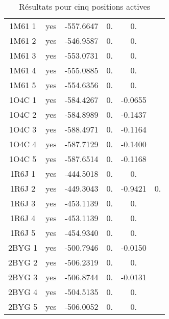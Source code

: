 \begin{table}[h]
{\begin{tabular}{cccccc}
        1M61 1 & yes &  -557.6647 & 0. & 0. &  \\
        1M61 2 & yes &  -546.9587 & 0. & 0. &  \\
        1M61 3 & yes &  -553.0731 & 0. & 0. &  \\
        1M61 4 & yes &  -555.0885 & 0. & 0. &  \\
        1M61 5 & yes &  -554.6356 & 0. & 0. &  \\
        1O4C 1 & yes &  -584.4267 & 0. & -0.0655 &  \\
        1O4C 2 & yes &  -584.8989 & 0. & -0.1437 &  \\
        1O4C 3 & yes &  -588.4971 & 0. & -0.1164 &  \\
        1O4C 4 & yes &  -587.7129 & 0. & -0.1400 &  \\
        1O4C 5 & yes &  -587.6514 & 0. & -0.1168 &  \\
        1R6J 1 & yes &  -444.5018 & 0. & 0. &  \\
        1R6J 2 & yes &  -449.3043 & 0. & -0.9421 & 0. \\
        1R6J 3 & yes &  -453.1139 & 0. & 0. &  \\
        1R6J 4 & yes &  -453.1139 & 0. & 0. &  \\
        1R6J 5 & yes &  -454.9340 & 0. & 0. &  \\
        2BYG 1 & yes &  -500.7946 & 0. & -0.0150 &  \\
        2BYG 2 & yes &  -506.2319 & 0. & 0. &  \\
        2BYG 3 & yes &  -506.8744 & 0. & -0.0131 &  \\
        2BYG 4 & yes &  -504.5135 & 0. & 0. &  \\
        2BYG 5 & yes &  -506.0052 & 0. & 0. &  \\
        \bottomrule
      \end{tabular}      
}
 \caption{Résultats pour cinq positions actives}
\label{tab:result_5_actives}
\end{table}

